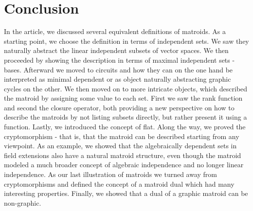 \newpage
\section{Conclusion}
In the article, we discussed several equivalent definitions of matroids. As a starting point, we choose the definition in terms of independent sets. We saw they naturally abstract the linear independent subsets of vector spaces. We then proceeded by showing the description in terms of maximal independent sets - bases. Afterward we moved to circuits and how they can on the one hand be interpreted as minimal dependent or as object naturally abstracting graphic cycles on the other. We then moved on to more intricate objects, which described the matroid by assigning some value to each set. First we saw the rank function and second the closure operator, both providing a new perspective on how to describe the matroids by not listing subsets directly, but rather present it using a function. Lastly, we introduced the concept of flat. Along the way, we proved the cryptomorphism - that is, that the matroid can be described starting from any viewpoint. As an example, we showed that the algebraically dependent sets in field extensions also have a natural matroid structure, even though the matroid modeled a much broader concept of algebraic independence and no longer linear independence. As our last illustration of matroids we turned away from cryptomorphisms and defined the concept of a matroid dual which had many interesting properties. Finally, we showed that a dual of a graphic matroid can be non-graphic.
